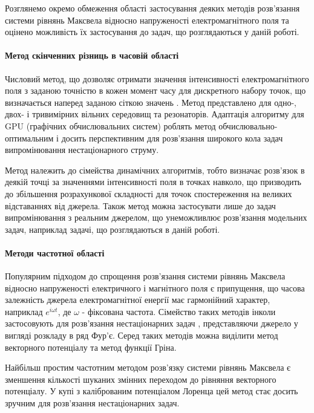 Розглянемо окремо обмеження області застосування деяких методів 
розв'язання системи рівнянь Максвела відносно напруженості 
електромагнітного поля та оцінено можливість їх застосування до задач, 
що розглядаються у даній роботі.

\paragraph{Метод скінченних різниць в часовій області}

Числовий метод, що дозволяє отримати значення інтенсивності електромагнітного 
поля з заданою точністю в кожен момент часу для дискретного набору точок, що
визначається наперед заданою сіткою значень \cite{imp:FDTD1966}. Метод 
представлено для одно-, двох- і тривимірних \cite{imp:FDTD1975} вільних 
середовищ та резонаторів. Адаптація алгоритму для GPU (графічних 
обчислювальних систем) \cite{imp:FDTD2011} роблять метод 
обчислювально-оптимальним і досить перспективним для розв'язання 
широкого кола задач випромінювання нестаціонарного струму.

Метод належить до сімейства динамічних алгоритмів, тобто визначає розв'язок 
в деякій точці за значеннями інтенсивності поля в точках навколо, що 
призводить до збільшення розрахункової складності для точок спостереження на 
великих відставаннях від джерела. Також метод можна застосувати лише до 
задач випромінювання з реальним джерелом, що унеможливлює розв'язання 
модельних задач, наприклад задачі, що розглядаються в даній роботі.

\paragraph{Методи частотної області}

Популярним підходом до спрощення розв'язання системи рівнянь Максвела відносно
напруженості електричного і магнітного поля є припущення, що часова залежність 
джерела електромагнітної енергії має гармонійний характер, наприклад 
$ e^{i \omega t} $, де $ \omega $ - фіксована частота. Сімейство таких 
методів \cite{imp:Shubarin1960} інколи застосовують для розв'язання 
нестаціонарних задач \cite{imp:Harmuth1981}, представляючи джерело у вигляді 
розкладу в ряд Фур'є. Серед таких методів можна виділити метод векторного 
потенціалу та метод функції Гріна.

Найбільш простим частотним методом розв'язку системи рівнянь Максвела є 
зменшення кількості шуканих змінних переходом до рівняння векторного 
потенціалу. У купі з каліброваним потенціалом Лоренца цей метод стає досить 
зручним для розв'язання нестаціонарних задач.

